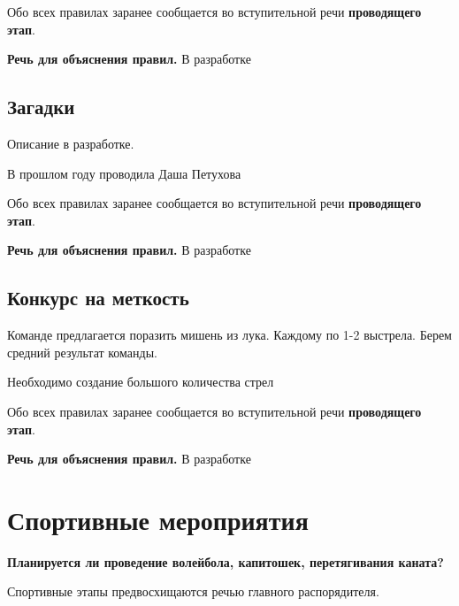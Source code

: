 \documentclass[a4paper, 14pt]{extarticle}
\theoremstyle{definition}
\begin{document}
\par Обо всех правилах заранее сообщается во вступительной речи \textbf{проводящего этап}.

\par \textbf{Речь для объяснения правил.} В разработке


{}
\subsection*{Загадки}

\par Описание в разработке.

\par В прошлом году проводила Даша Петухова

\par Обо всех правилах заранее сообщается во вступительной речи \textbf{проводящего этап}.

\par \textbf{Речь для объяснения правил.} В разработке


{}
\subsection*{Конкурс на меткость}

\par Команде предлагается поразить мишень из лука. Каждому по 1-2 выстрела. Берем средний результат команды.

\par Необходимо создание большого количества стрел

\par Обо всех правилах заранее сообщается во вступительной речи \textbf{проводящего этап}.

\par \textbf{Речь для объяснения правил.} В разработке


\cleardoublepage
{}
{}
\section*{Спортивные мероприятия}

\par \textbf{Планируется ли проведение волейбола, капитошек, перетягивания каната?}
\par Спортивные этапы предвосхищаются речью главного распорядителя.
\end{document}
